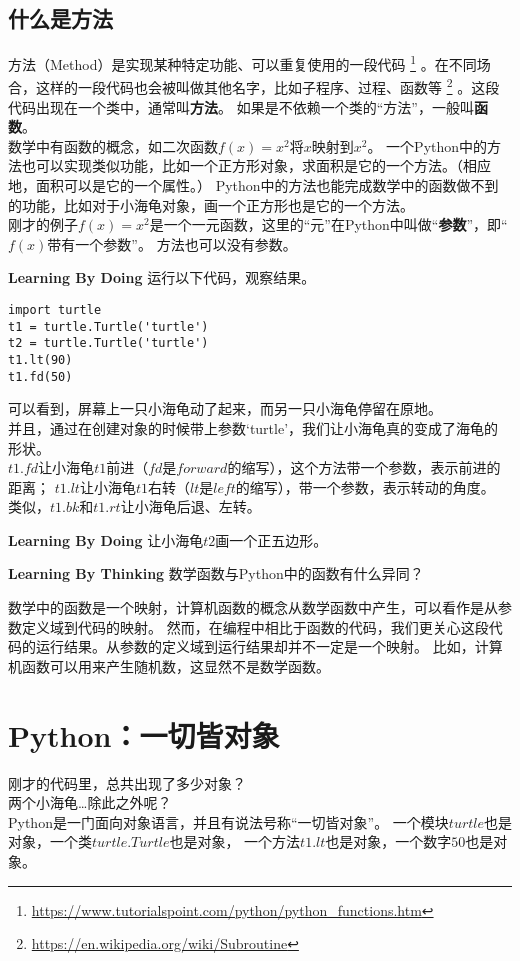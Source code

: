 \subsection{什么是方法}
方法（Method）是实现某种特定功能、可以重复使用的一段代码
\footnote{\url{https://www.tutorialspoint.com/python/python_functions.htm}}
。在不同场合，这样的一段代码也会被叫做其他名字，比如子程序、过程、函数等
\footnote{\url{https://en.wikipedia.org/wiki/Subroutine}}
。这段代码出现在一个类中，通常叫\textbf{方法}。
如果是不依赖一个类的“方法”，一般叫\textbf{函数}。\\
数学中有函数的概念，如二次函数$f(x) = x^2$将$x$映射到$x^2$。
一个Python中的方法也可以实现类似功能，比如一个正方形对象，求面积是它的一个方法。（相应地，面积可以是它的一个属性。）
Python中的方法也能完成数学中的函数做不到的功能，比如对于小海龟对象，画一个正方形也是它的一个方法。\\
刚才的例子$f(x) = x^2$是一个一元函数，这里的“元”在Python中叫做“\textbf{参数}”，即“$f(x)$带有一个参数”。
方法也可以没有参数。\\
\begin{paperbox}{\textbf{Learning By Doing}\starfive}
运行以下代码，观察结果。
\begin{lstlisting}[style=PythonStyle1, caption=Rectangle]
import turtle
t1 = turtle.Turtle('turtle')
t2 = turtle.Turtle('turtle')
t1.lt(90)
t1.fd(50)
\end{lstlisting}
\end{paperbox}
可以看到，屏幕上一只小海龟动了起来，而另一只小海龟停留在原地。\\
并且，通过在创建对象的时候带上参数`turtle'，我们让小海龟真的变成了海龟的形状。\\
$t1.fd$让小海龟$t1$前进（$fd$是$forward$的缩写），这个方法带一个参数，表示前进的距离；
$t1.lt$让小海龟$t1$右转（$lt$是$left$的缩写），带一个参数，表示转动的角度。\\
类似，$t1.bk$和$t1.rt$让小海龟后退、左转。
\begin{paperbox}{\textbf{Learning By Doing}\starfive}
让小海龟$t2$画一个正五边形。
\end{paperbox}
\begin{paperbox}{\textbf{Learning By Thinking\starthree}}
数学函数与Python中的函数有什么异同？
\end{paperbox}
数学中的函数是一个映射，计算机函数的概念从数学函数中产生，可以看作是从参数定义域到代码的映射。
然而，在编程中相比于函数的代码，我们更关心这段代码的运行结果。从参数的定义域到运行结果却并不一定是一个映射。
比如，计算机函数可以用来产生随机数，这显然不是数学函数。
\section{Python：一切皆对象}
刚才的代码里，总共出现了多少对象？\\
两个小海龟…除此之外呢？\\
Python是一门面向对象语言，并且有说法号称“一切皆对象”。
一个模块$turtle$也是对象，一个类$turtle.Turtle$也是对象，
一个方法$t1.lt$也是对象，一个数字$50$也是对象。\\
